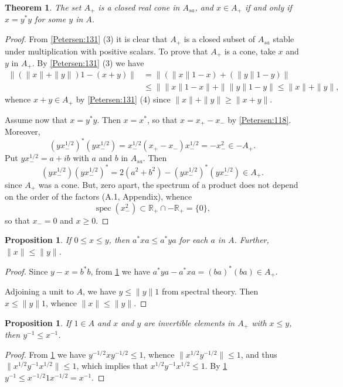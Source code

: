 \documentclass{book}
\newtheorem{proposition}[definition]{Proposition}
\newtheorem{theorem}[definition]{Theorem}
\begin{document}
\begin{theorem}\label{Petersen:133}
  The set \(A_+\) is a closed real cone in \(A_{sa}\), and \(x \in A_+\) if and only if \(x =y^* y\) for
  some \(y\) in \(A\).
\end{theorem}
\begin{proof}
  From \ref{Petersen:131} (3) it is clear that \(A_+\) is a closed subset of \(A_{sa}\) stable under
  multiplication with positive scalars. To prove that \(A_+\) is a cone, take \(x\) and \(y\) in
  \(A_+\). By \ref{Petersen:131} (3) we have
  \begin{align*}
    \|(\|x\|+\|y\|)1-(x +y)\|&=\|(\|x\|1-x)+(\|y\|1-y)\|\\
    &\leq\|\|x\|1-x\|+\|\|y\|1-y\|\leq\|x\|+\|y\|,
  \end{align*}
  whence \(x +y \in A_+\) by \ref{Petersen:131} (4) since \(\|x\|+\|y\|\geq\|x +y\|\).\par
  Assume now that \(x = y^* y\). Then \(x = x^*\), so that \(x = x_+ - x_-\) by \ref{Petersen:118}.
  Moreover,
  \[
  (yx_-^{1/2})^*(y x^{1/2}_-)=x^{1/2}_- (x_+-x_-)x^{1/2}_-=-x_-^2\in -A_+.
  \]
  Put \(yx^{1/2}_-=a+ib\) with \(a\) and \(b\) in \(A_{sa}\). Then
  \[
    (yx^{1/2}_- )(yx^{1/2}_- )^*=
    2(a^2+b^2)-(yx^{1/2}_-)^*(yx_-^{1/2}) \in A_+.
  \]
  since \(A_+\) was a cone. But, zero apart, the spectrum of a product does not depend
  on the order of the factors (A.1, Appendix), whence
  \[
    \operatorname{spec}(x^2_-) \subset \mathbb{R}_+ \cap -\mathbb{R}_+ =\{0\},
  \]
  so that \(x_- =0\) and \(x \geq 0\).
\end{proof}

\begin{proposition}\label{Petersen:135}
  If \(0\leq x\leq y\), then \(a^* x a\leq a^* ya\) for each \(a\) in \(A\). Further, \(\|x\|\leq\|y\|\).
\end{proposition}
\begin{proof}
  Since \(y-x=b^* b\), from \ref{Petersen:133} we have \(a^* ya-a^* xa={(ba)}^*(ba)\in A_+\).\par
  Adjoining a unit to \(A\), we have \(y\leq\|y\|1\) from spectral theory. Then \(x\leq\|y\|1\), whence \(\|x\|\leq\|y\|\).
\end{proof}

\begin{proposition}\label{Petersen:136}
  If \(1 \in A\) and \(x\) and \(y\) are invertible elements in \(A_+\) with \(x \leq y\), then \(y^{-1} \leq x^{-1}\).
\end{proposition}
\begin{proof}
  From \ref{Petersen:135} we have \(y^{-1/2}x y^{-1/2} \leq 1\), whence \(\|x^{1/2} y^{-1/2}\| \leq 1\), and
  thus \(\|x^{1/2}y^{-1} x^{1/2}\| \leq 1\), which implies that \(x^{1/2}y^{-1} x^{1/2} \leq 1\). By \ref{Petersen:135} 
  \(y^{-1} \leq x^{-1/2} 1 x^{-1/2} = x^{-1}\).
\end{proof}
\end{document}
